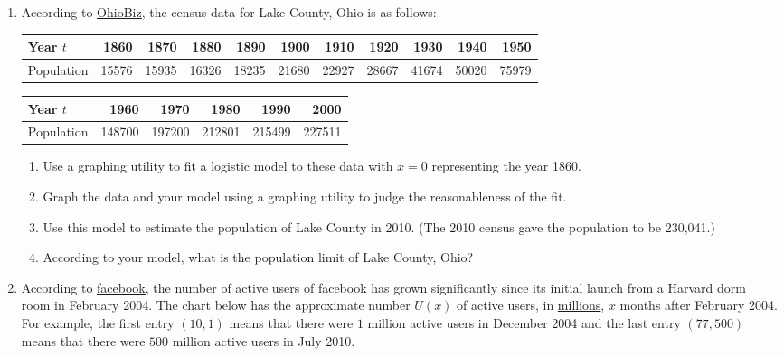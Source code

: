 \documentclass{ximera}
\begin{document}
\begin{enumerate}
\begin{enumerate}
\end{enumerate}

\item  According to \href{http://www.ohiobiz.com/census/Lake.pdf}{\underline{OhioBiz}}, the census data for Lake County, Ohio is as follows:

\small
\noindent \begin{tabular}{|l|r|r|r|r|r|r|r|r|r|r|} \hline
Year $t$ & 1860 & 1870 & 1880 & 1890 & 1900 & 1910 & 1920 & 1930 & 1940 & 1950 \\ \hline 
Population& 15576 & 15935 & 16326 & 18235 & 21680 & 22927 & 28667 & 41674 & 50020 & 75979 \\ \hline
\end{tabular}

\noindent \begin{tabular}{|l|r|r|r|r|r|} \hline
Year $t$ & 1960 & 1970 & 1980 & 1990 & 2000 \\ \hline 
Population& 148700 & 197200 & 212801 & 215499 & 227511 \\ \hline
\end{tabular}

\normalsize

\begin{enumerate}

\item  Use a graphing utility to fit a logistic model to these data with $x = 0$ representing the year 1860. 

\item  Graph the data and your model using a graphing utility to judge the reasonableness of the fit.

\item  Use this model to estimate the population of Lake County in 2010.  (The 2010 census gave the population to be 230,041.)

\item  According to your model, what is the population limit of Lake County, Ohio?

\end{enumerate}


\item According to \href{http://www.facebook.com/press/info.php?timeline}{\underline{facebook}}, the number of active users of facebook has grown significantly since its initial launch from a Harvard dorm room in February 2004. The chart below has the approximate number $U(x)$ of active users, in \underline{millions}, $x$ months after February 2004.  For example, the first entry $(10, 1)$ means that there were $1$ million active users in December 2004 and the last entry $(77, 500)$ means that there were $500$ million active users in July 2010.


\end{enumerate}
\end{document}
